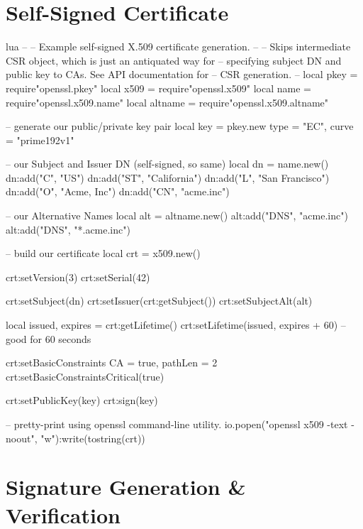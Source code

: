 \documentclass[11pt, oneside]{memoir}
\begin{document}
\section{Self-Signed Certificate}

\begin{example}{lua}
--
-- Example self-signed X.509 certificate generation.
--
-- Skips intermediate CSR object, which is just an antiquated way for
-- specifying subject DN and public key to CAs. See API documentation for
-- CSR generation.
--
local pkey = require"openssl.pkey"
local x509 = require"openssl.x509"
local name = require"openssl.x509.name"
local altname = require"openssl.x509.altname"

-- generate our public/private key pair
local key = pkey.new{ type = "EC", curve = "prime192v1" }

-- our Subject and Issuer DN (self-signed, so same)
local dn = name.new()
dn:add("C", "US")
dn:add("ST", "California")
dn:add("L", "San Francisco")
dn:add("O", "Acme, Inc")
dn:add("CN", "acme.inc")

-- our Alternative Names
local alt = altname.new()
alt:add("DNS", "acme.inc")
alt:add("DNS", "*.acme.inc")

-- build our certificate
local crt = x509.new()

crt:setVersion(3)
crt:setSerial(42)

crt:setSubject(dn)
crt:setIssuer(crt:getSubject())
crt:setSubjectAlt(alt)

local issued, expires = crt:getLifetime()
crt:setLifetime(issued, expires + 60) -- good for 60 seconds

crt:setBasicConstraints{ CA = true, pathLen = 2 }
crt:setBasicConstraintsCritical(true)

crt:setPublicKey(key)
crt:sign(key)

-- pretty-print using openssl command-line utility.
io.popen("openssl x509 -text -noout", "w"):write(tostring(crt))


\end{example}


\clearpage

\section{Signature Generation \& Verification}
\end{document}
